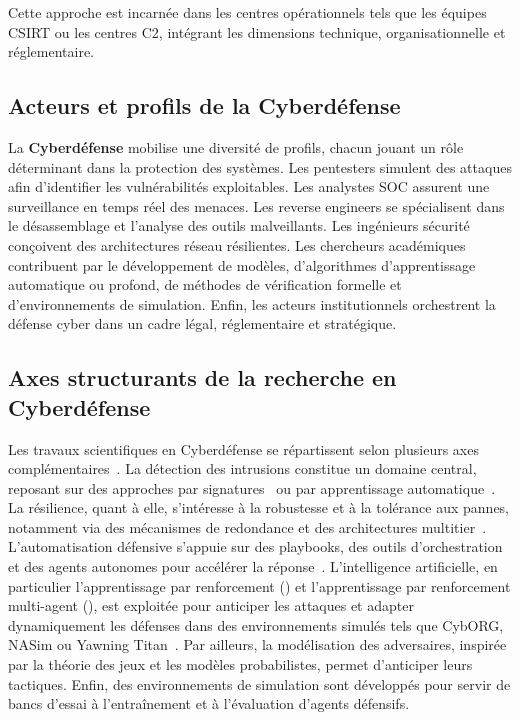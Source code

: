Cette approche est incarnée dans les centres opérationnels tels que les équipes \ac{CSIRT} ou les centres \ac{C2}, intégrant les dimensions technique, organisationnelle et réglementaire.

\subsection*{Acteurs et profils de la Cyberdéfense}

La \textbf{Cyberdéfense} mobilise une diversité de profils, chacun jouant un rôle déterminant dans la protection des systèmes. Les pentesters simulent des attaques afin d'identifier les vulnérabilités exploitables. Les analystes \ac{SOC} assurent une surveillance en temps réel des menaces. Les reverse engineers se spécialisent dans le désassemblage et l'analyse des outils malveillants. Les ingénieurs sécurité conçoivent des architectures réseau résilientes. Les chercheurs académiques contribuent par le développement de modèles, d'algorithmes d'apprentissage automatique ou profond, de méthodes de vérification formelle et d'environnements de simulation. Enfin, les acteurs institutionnels orchestrent la défense cyber dans un cadre légal, réglementaire et stratégique.


\subsection*{Axes structurants de la recherche en Cyberdéfense}

Les travaux scientifiques en Cyberdéfense se répartissent selon plusieurs axes complémentaires~\cite{Buczak2016}. La détection des intrusions constitue un domaine central, reposant sur des approches par signatures~\cite{Axelsson2000} ou par apprentissage automatique~\cite{Sommer2010,Buczak2016}. La résilience, quant à elle, s'intéresse à la robustesse et à la tolérance aux pannes, notamment via des mécanismes de redondance et des architectures multitier~\cite{Bodeau2011}. L'automatisation défensive s'appuie sur des playbooks, des outils d'orchestration et des agents autonomes pour accélérer la réponse~\cite{Hazra2022}. L'intelligence artificielle, en particulier l'apprentissage par renforcement () et l'apprentissage par renforcement multi-agent (), est exploitée pour anticiper les attaques et adapter dynamiquement les défenses dans des environnements simulés tels que CybORG, NASim ou Yawning Titan~\cite{Standen2021, nasim2023,Andrew2022}. Par ailleurs, la modélisation des adversaires, inspirée par la théorie des jeux et les modèles probabilistes, permet d'anticiper leurs tactiques. Enfin, des environnements de simulation sont développés pour servir de bancs d'essai à l'entraînement et à l'évaluation d'agents défensifs.

